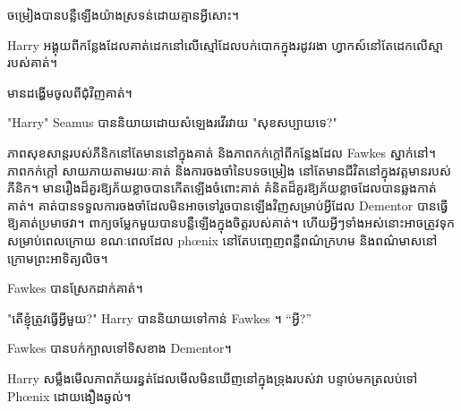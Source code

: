 
 ចម្រៀង​បាន​បន្លឺ​ឡើង​យ៉ាង​ស្រទន់​ដោយ​គ្មាន​អ្វី​សោះ។

\hplettrineextrapara
Harry អង្គុយពីកន្លែងដែលគាត់ដេកនៅលើស្មៅដែលបក់បោកក្នុងរដូវរងា ហ្វាកស៍នៅតែដេកលើស្មារបស់គាត់។

មានដង្ហើមចូលពីជុំវិញគាត់។

"Harry" Seamus បាននិយាយដោយសំឡេងរវើរវាយ "សុខសប្បាយទេ?"

ភាពសុខសាន្តរបស់ភីនិកនៅតែមាននៅក្នុងគាត់ និងភាពកក់ក្តៅពីកន្លែងដែល Fawkes ស្នាក់នៅ។ ភាពកក់ក្ដៅ សាយភាយតាមរយៈគាត់ និងការចងចាំនៃបទចម្រៀង នៅតែមានជីវិតនៅក្នុងវត្តមានរបស់ ភីនិក។ មានរឿងដ៏គួរឱ្យភ័យខ្លាចបានកើតឡើងចំពោះគាត់ គំនិតដ៏គួរឱ្យភ័យខ្លាចដែលបានឆ្លងកាត់គាត់។ គាត់​បាន​ទទួល​ការ​ចង​ចាំ​ដែល​មិន​អាច​ទៅ​រួច​បាន​ឡើង​វិញ​សម្រាប់​អ្វី​ដែល​ Dementor បាន​ធ្វើ​ឱ្យ​គាត់​ប្រមាថ​វា។ ពាក្យចម្លែកមួយបានបន្លឺឡើងក្នុងចិត្តរបស់គាត់។ ហើយអ្វីៗទាំងអស់នោះអាចត្រូវទុកសម្រាប់ពេលក្រោយ ខណៈពេលដែល phœnix នៅតែបញ្ចេញពន្លឺពណ៌ក្រហម និងពណ៌មាសនៅក្រោមព្រះអាទិត្យលិច។

Fawkes បានស្រែកដាក់គាត់។

"តើខ្ញុំត្រូវធ្វើអ្វីមួយ?" Harry បាននិយាយទៅកាន់ Fawkes ។ “អ្វី?”

Fawkes បាន​បក់​ក្បាល​ទៅ​ទិស​ខាង​ Dementor។

Harry សម្លឹងមើលភាពភ័យរន្ធត់ដែលមើលមិនឃើញនៅក្នុងទ្រុងរបស់វា បន្ទាប់មកត្រលប់ទៅ Phœnix ដោយងឿងឆ្ងល់។

